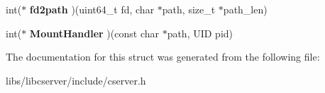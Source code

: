 \begin{DoxyCompactItemize}
\item 
int($\ast$ {\bfseries fd2path} )(uint64\+\_\+t fd, char $\ast$path, size\+\_\+t $\ast$path\+\_\+len)\hypertarget{structcserver__handlers_a34f566bd9fb99a4eb4aa12761f5d2b28}{}\label{structcserver__handlers_a34f566bd9fb99a4eb4aa12761f5d2b28}

\item 
int($\ast$ {\bfseries Mount\+Handler} )(const char $\ast$path, U\+ID pid)\hypertarget{structcserver__handlers_a1457b378f09313b92a8d19c4feb2d630}{}\label{structcserver__handlers_a1457b378f09313b92a8d19c4feb2d630}

\end{DoxyCompactItemize}


The documentation for this struct was generated from the following file\+:\begin{DoxyCompactItemize}
\item 
libs/libcserver/include/cserver.\+h\end{DoxyCompactItemize}
